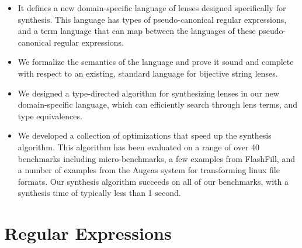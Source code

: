 \documentclass[numbers,10pt,preprint\ifanon ,nocopyrightspace\fi]{sigplanconf}
\begin{document}
\begin{itemize}
\item It defines a new domain-specific language of lenses designed specifically
  for synthesis.  This language has types of pseudo-canonical regular
  expressions, and a term language that can map between the languages of these
  pseudo-canonical regular expressions.
\item We formalize the semantics of the language and prove it sound and complete
  with respect to an existing, standard language for bijective string lenses.
\item We designed a type-directed algorithm for synthesizing lenses in our new
  domain-specific language, which can efficiently search through lens terms, and
  type equivalences.
\item We developed a collection of optimizations that speed up the
  synthesis algorithm.  This algorithm has been evaluated on a range of
  over 40 benchmarks including micro-benchmarks, a few examples from FlashFill,
  and a number of examples from the Augeas system for transforming linux
  file formats.  Our synthesis algorithm succeeds on all of our
  benchmarks, with a synthesis time of typically less than 1 second.
\end{itemize}

\section{Regular Expressions}
\end{document}
